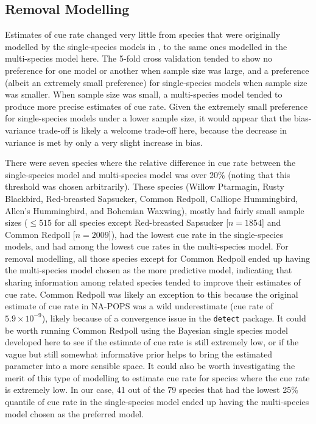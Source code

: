 \documentclass[12pt]{article}
\begin{document}
\subsection{Removal Modelling}
\par Estimates of cue rate changed very little from species that were originally modelled by the single-species models in \citet{edwards_point_2023}, to the same ones modelled in the multi-species model here.
The 5-fold cross validation tended to show no preference for one model or another when sample size was large, and a preference (albeit an extremely small preference) for single-species models when sample size was smaller.
When sample size was small, a multi-species model tended to produce more precise estimates of cue rate.
Given the extremely small preference for single-species models under a lower sample size, it would appear that the bias-variance trade-off is likely a welcome trade-off here, because the decrease in variance is met by only a very slight increase in bias.

\par There were seven species where the relative difference in cue rate between the single-species model and multi-species model was over 20\% (noting that this threshold was chosen arbitrarily).
These species (Willow Ptarmagin, Rusty Blackbird, Red-breasted Sapsucker, Common Redpoll, Calliope Hummingbird, Allen's Hummingbird, and Bohemian Waxwing), mostly had fairly small sample sizes ($\leq 515$ for all species except Red-breasted Sapsucker [$n = 1854$] and Common Redpoll [$n = 2009$]), had the lowest cue rate in the single-species models, and had among the lowest cue rates in the multi-species model.
For removal modelling, all those species except for Common Redpoll ended up having the multi-species model chosen as the more predictive model, indicating that sharing information among related species tended to improve their estimates of cue rate.
Common Redpoll was likely an exception to this because the original estimate of cue rate in NA-POPS was a wild underestimate (cue rate of $5.9\times 10^{-9}$), likely because of a convergence issue in the \texttt{detect} package.
It could be worth running Common Redpoll using the Bayesian single species model developed here to see if the estimate of cue rate is still extremely low, or if the vague but still somewhat informative prior helps to bring the estimated parameter into a more sensible space.
It could also be worth investigating the merit of this type of modelling to estimate cue rate for species where the cue rate is extremely low.
In our case, 41 out of the 79 species that had the lowest 25\% quantile of cue rate in the single-species model ended up having the multi-species model chosen as the preferred model.
\end{document}
